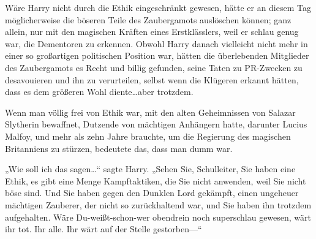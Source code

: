Wäre Harry nicht durch die Ethik eingeschränkt gewesen, hätte er an diesem Tag möglicherweise die böseren Teile des Zaubergamots auslöschen können; ganz allein, nur mit den magischen Kräften eines Erstklässlers, weil er schlau genug war, die Dementoren zu erkennen. Obwohl Harry danach vielleicht nicht mehr in einer so großartigen politischen Position war, hätten die überlebenden Mitglieder des Zaubergamots es Recht und billig gefunden, seine Taten zu PR-Zwecken zu desavouieren und ihn zu verurteilen, selbst wenn die Klügeren erkannt hätten, dass es dem größeren Wohl diente…aber trotzdem.

Wenn man völlig frei von Ethik war, mit den alten Geheimnissen von Salazar Slytherin bewaffnet, Dutzende von mächtigen Anhängern hatte, darunter Lucius Malfoy, und mehr als zehn Jahre brauchte, um die Regierung des magischen Britanniens zu stürzen, bedeutete das, dass man dumm war.

„Wie soll ich das sagen…“ sagte Harry. „Sehen Sie, Schulleiter, Sie haben eine Ethik, es gibt eine Menge Kampftaktiken, die Sie nicht anwenden, weil Sie nicht böse sind. Und Sie haben gegen den Dunklen Lord gekämpft, einen ungeheuer mächtigen Zauberer, der nicht so zurückhaltend war, und Sie haben ihn trotzdem aufgehalten. Wäre Du-weißt-schon-wer obendrein noch superschlau gewesen, wärt ihr tot. Ihr alle. Ihr wärt auf der Stelle gestorben—“


